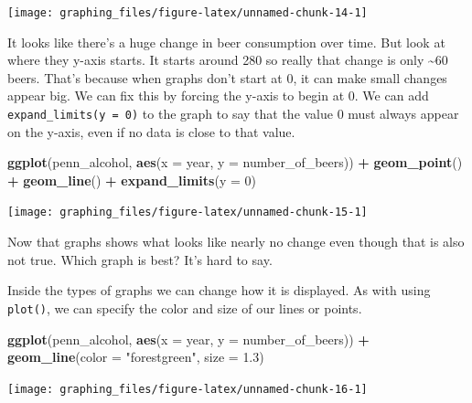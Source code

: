 \documentclass[
  12pt,
]{book}
\newenvironment{Shaded}{\begin{snugshade}}{\end{snugshade}}
\newcommand{\DataTypeTok}[1]{\textcolor[rgb]{0.13,0.29,0.53}{#1}}
\newcommand{\DecValTok}[1]{\textcolor[rgb]{0.00,0.00,0.81}{#1}}
\newcommand{\FloatTok}[1]{\textcolor[rgb]{0.00,0.00,0.81}{#1}}
\newcommand{\KeywordTok}[1]{\textcolor[rgb]{0.13,0.29,0.53}{\textbf{#1}}}
\newcommand{\NormalTok}[1]{#1}
\newcommand{\OperatorTok}[1]{\textcolor[rgb]{0.81,0.36,0.00}{\textbf{#1}}}
\newcommand{\StringTok}[1]{\textcolor[rgb]{0.31,0.60,0.02}{#1}}
\begin{document}
\begin{center}\texttt{[image: graphing\_files/figure-latex/unnamed-chunk-14-1]} \end{center}

It looks like there's a huge change in beer consumption over time. But look at where they y-axis starts. It starts around 280 so really that change is only \textasciitilde60 beers. That's because when graphs don't start at 0, it can make small changes appear big. We can fix this by forcing the y-axis to begin at 0. We can add \texttt{expand\_limits(y\ =\ 0)} to the graph to say that the value 0 must always appear on the y-axis, even if no data is close to that value.

\begin{Shaded}
\begin{Highlighting}[]
\KeywordTok{ggplot}\NormalTok{(penn\_alcohol, }\KeywordTok{aes}\NormalTok{(}\DataTypeTok{x =}\NormalTok{ year, }\DataTypeTok{y =}\NormalTok{ number\_of\_beers)) }\OperatorTok{+}
\StringTok{  }\KeywordTok{geom\_point}\NormalTok{() }\OperatorTok{+}
\StringTok{  }\KeywordTok{geom\_line}\NormalTok{() }\OperatorTok{+}
\StringTok{  }\KeywordTok{expand\_limits}\NormalTok{(}\DataTypeTok{y =} \DecValTok{0}\NormalTok{)}
\end{Highlighting}
\end{Shaded}

\begin{center}\texttt{[image: graphing\_files/figure-latex/unnamed-chunk-15-1]} \end{center}

Now that graphs shows what looks like nearly no change even though that is also not true. Which graph is best? It's hard to say.

Inside the types of graphs we can change how it is displayed. As with using \texttt{plot()}, we can specify the color and size of our lines or points.

\begin{Shaded}
\begin{Highlighting}[]
\KeywordTok{ggplot}\NormalTok{(penn\_alcohol, }\KeywordTok{aes}\NormalTok{(}\DataTypeTok{x =}\NormalTok{ year, }\DataTypeTok{y =}\NormalTok{ number\_of\_beers)) }\OperatorTok{+}
\StringTok{  }\KeywordTok{geom\_line}\NormalTok{(}\DataTypeTok{color =} \StringTok{"forestgreen"}\NormalTok{, }\DataTypeTok{size =} \FloatTok{1.3}\NormalTok{)}
\end{Highlighting}
\end{Shaded}

\begin{center}\texttt{[image: graphing\_files/figure-latex/unnamed-chunk-16-1]} \end{center}
\end{document}
